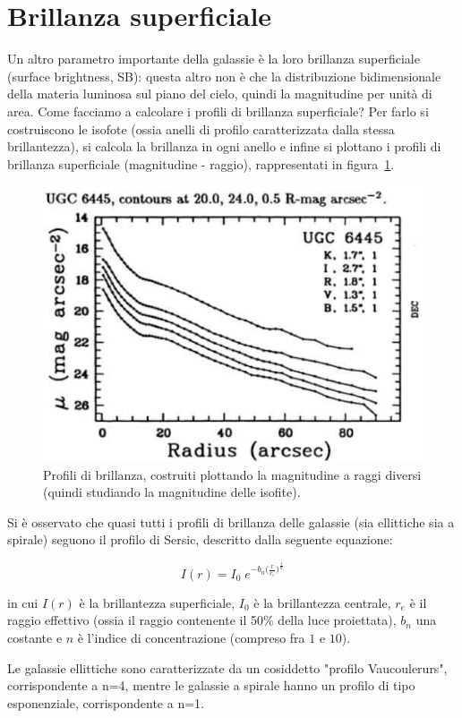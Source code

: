 \section{Brillanza superficiale}\label{sec:brillanza-superficiale}
Un altro parametro importante della galassie è la loro brillanza superficiale (surface brightness, SB): questa altro non è che la distribuzione bidimensionale della materia luminosa sul piano del cielo, quindi la magnitudine per unità di area. Come facciamo a calcolare i profili di brillanza superficiale? Per farlo si costruiscono le isofote (ossia anelli di profilo caratterizzata dalla stessa brillantezza), si calcola la brillanza in ogni anello e infine si plottano i profili di brillanza superficiale (magnitudine - raggio), rappresentati in figura~\ref{fig:profili-brillanza}.

\begin{figure}
    \centering
    \includegraphics[width = 0.5 \textwidth]{immagini/profili-di-brillanza.jpg}
    \caption{Profili di brillanza, costruiti plottando la magnitudine a raggi diversi (quindi studiando la magnitudine delle isofite).}
    \label{fig:profili-brillanza}
\end{figure}

Si è osservato che quasi tutti i profili di brillanza delle galassie (sia ellittiche sia a spirale) seguono il profilo di Sersic, descritto dalla seguente equazione:

\begin{equation*}
    I(r) = I_0 \; e^{-b_n \big(\frac{r}{r_e}\big)^\frac{1}{n}}
\end{equation*}

in cui $I(r)$ è la brillantezza superficiale, $I_0$ è la brillantezza centrale, $r_e$ è il raggio effettivo (ossia il raggio contenente il 50\% della luce proiettata), $b_n$ una costante e $n$ è l'indice di concentrazione (compreso fra $1$ e $10$).

Le galassie ellittiche sono caratterizzate da un cosiddetto "profilo Vaucoulerurs", corrispondente a n=4, mentre le galassie a spirale hanno un profilo di tipo esponenziale, corrispondente a n=1. 